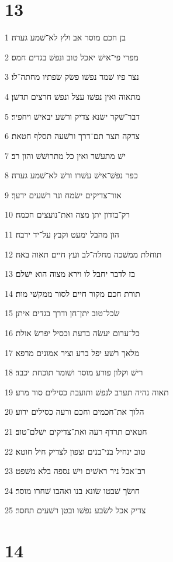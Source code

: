 \chapter{13}

\par 1 בן חכם מוסר אב ולץ לא־שׁמע גערה׃
\par 2 מפרי פי־אישׁ יאכל טוב ונפשׁ בגדים חמס׃
\par 3 נצר פיו שׁמר נפשׁו פשׂק שׂפתיו מחתה־לו׃
\par 4 מתאוה ואין נפשׁו עצל ונפשׁ חרצים תדשׁן׃
\par 5 דבר־שׁקר ישׂנא צדיק ורשׁע יבאישׁ ויחפיר׃
\par 6 צדקה תצר תם־דרך ורשׁעה תסלף חטאת׃
\par 7 ישׁ מתעשׁר ואין כל מתרושׁשׁ והון רב׃
\par 8 כפר נפשׁ־אישׁ עשׁרו ורשׁ לא־שׁמע גערה׃
\par 9 אור־צדיקים ישׂמח ונר רשׁעים ידעך׃
\par 10 רק־בזדון יתן מצה ואת־נועצים חכמה׃
\par 11 הון מהבל ימעט וקבץ על־יד ירבה׃
\par 12 תוחלת ממשׁכה מחלה־לב ועץ חיים תאוה באה׃
\par 13 בז לדבר יחבל לו וירא מצוה הוא ישׁלם׃
\par 14 תורת חכם מקור חיים לסור ממקשׁי מות׃
\par 15 שׂכל־טוב יתן־חן ודרך בגדים איתן׃
\par 16 כל־ערום יעשׂה בדעת וכסיל יפרשׂ אולת׃
\par 17 מלאך רשׁע יפל ברע וציר אמונים מרפא׃
\par 18 רישׁ וקלון פורע מוסר ושׁומר תוכחת יכבד׃
\par 19 תאוה נהיה תערב לנפשׁ ותועבת כסילים סור מרע׃
\par 20 הלוך את־חכמים וחכם ורעה כסילים ירוע׃
\par 21 חטאים תרדף רעה ואת־צדיקים ישׁלם־טוב׃
\par 22 טוב ינחיל בני־בנים וצפון לצדיק חיל חוטא׃
\par 23 רב־אכל ניר ראשׁים וישׁ נספה בלא משׁפט׃
\par 24 חושׂך שׁבטו שׂונא בנו ואהבו שׁחרו מוסר׃
\par 25 צדיק אכל לשׂבע נפשׁו ובטן רשׁעים תחסר׃

\chapter{14}


